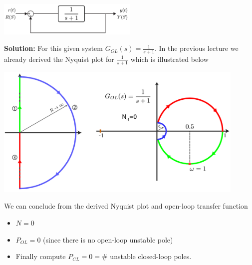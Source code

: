 \documentclass[twoside]{article}
\begin{document}
\vspace{6 pt}

  \begin{minipage}[h]{1\linewidth}
    \begin{center}
      \includegraphics[width=0.5\textwidth]{ex1block}
    \end{center}
  \end{minipage}

\vspace{6 pt}

\textbf{Solution:} For this given system $G_{OL}(s) = \frac{1}{s+1}$.
In the previous lecture we already derived the Nyquist plot for $\frac{1}{s+1}$
which is illustrated below

\vspace{6 pt}

  \begin{minipage}[h]{1\linewidth}
    \begin{center}
      \includegraphics[width=0.9\textwidth]{ex1}
    \end{center}
  \end{minipage}

\vspace{6 pt}

We can conclude from the derived Nyquist plot and
open-loop transfer function

\begin{itemize}
 \item $N = 0$
 \item $P_{OL} = 0$ (since there is no open-loop unstable pole) 
 \item Finally compute $P_{CL} = 0 = \#$ unstable closed-loop poles.
\end{itemize}
\end{document}

